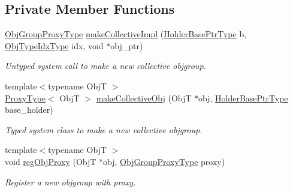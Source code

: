 \subsection*{Private Member Functions}
\begin{DoxyCompactItemize}
\item 
\hyperlink{namespacevt_ad7cae989df485fccca57f0792a880a8e}{Obj\+Group\+Proxy\+Type} \hyperlink{structvt_1_1objgroup_1_1_obj_group_manager_ab9885f22f148479bb68f3a59a147cdec}{make\+Collective\+Impl} (\hyperlink{structvt_1_1objgroup_1_1_obj_group_manager_ac1e9bb19d4a5923dd6d595bad28f04c9}{Holder\+Base\+Ptr\+Type} b, \hyperlink{namespacevt_1_1objgroup_a378e4b966221779c74f3a2f921eb2421}{Obj\+Type\+Idx\+Type} idx, void $\ast$obj\+\_\+ptr)
\begin{DoxyCompactList}\small\item\em Untyped system call to make a new collective objgroup. \end{DoxyCompactList}\item 
{\footnotesize template$<$typename ObjT $>$ }\\\hyperlink{structvt_1_1objgroup_1_1_obj_group_manager_aea65eef52f240a52210132eef5ce591f}{Proxy\+Type}$<$ ObjT $>$ \hyperlink{structvt_1_1objgroup_1_1_obj_group_manager_af5a05ad71853f2805cad4e08c2cedabe}{make\+Collective\+Obj} (ObjT $\ast$obj, \hyperlink{structvt_1_1objgroup_1_1_obj_group_manager_ac1e9bb19d4a5923dd6d595bad28f04c9}{Holder\+Base\+Ptr\+Type} base\+\_\+holder)
\begin{DoxyCompactList}\small\item\em Typed system class to make a new collective objgroup. \end{DoxyCompactList}\item 
{\footnotesize template$<$typename ObjT $>$ }\\void \hyperlink{structvt_1_1objgroup_1_1_obj_group_manager_a73d5d6f3f63c1243d7f0ea11f33a4661}{reg\+Obj\+Proxy} (ObjT $\ast$obj, \hyperlink{namespacevt_ad7cae989df485fccca57f0792a880a8e}{Obj\+Group\+Proxy\+Type} proxy)
\begin{DoxyCompactList}\small\item\em Register a new objgroup with proxy. \end{DoxyCompactList}\end{DoxyCompactItemize}

